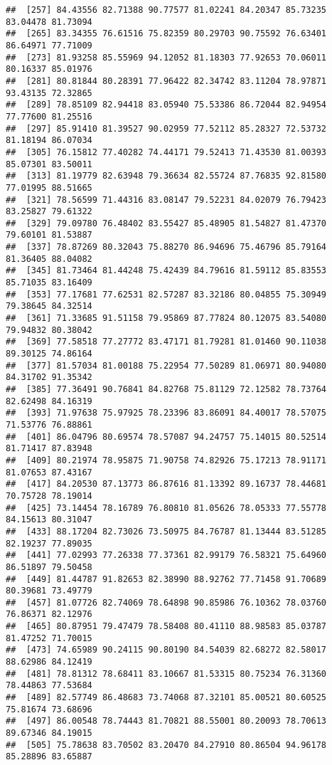 \documentclass[
]{article}
\begin{document}
\begin{verbatim}
##  [257] 84.43556 82.71388 90.77577 81.02241 84.20347 85.73235 83.04478 81.73094
##  [265] 83.34355 76.61516 75.82359 80.29703 90.75592 76.63401 86.64971 77.71009
##  [273] 81.93258 85.55969 94.12052 81.18303 77.92653 70.06011 80.16337 85.01976
##  [281] 80.81844 80.28391 77.96422 82.34742 83.11204 78.97871 93.43135 72.32865
##  [289] 78.85109 82.94418 83.05940 75.53386 86.72044 82.94954 77.77600 81.25516
##  [297] 85.91410 81.39527 90.02959 77.52112 85.28327 72.53732 81.18194 86.07034
##  [305] 76.15812 77.40282 74.44171 79.52413 71.43530 81.00393 85.07301 83.50011
##  [313] 81.19779 82.63948 79.36634 82.55724 87.76835 92.81580 77.01995 88.51665
##  [321] 78.56599 71.44316 83.08147 79.52231 84.02079 76.79423 83.25827 79.61322
##  [329] 79.09780 76.48402 83.55427 85.48905 81.54827 81.47370 79.60101 81.53887
##  [337] 78.87269 80.32043 75.88270 86.94696 75.46796 85.79164 81.36405 88.04082
##  [345] 81.73464 81.44248 75.42439 84.79616 81.59112 85.83553 85.71035 83.16409
##  [353] 77.17681 77.62531 82.57287 83.32186 80.04855 75.30949 79.38645 84.32514
##  [361] 71.33685 91.51158 79.95869 87.77824 80.12075 83.54080 79.94832 80.38042
##  [369] 77.58518 77.27772 83.47171 81.79281 81.01460 90.11038 89.30125 74.86164
##  [377] 81.57034 81.00188 75.22954 77.50289 81.06971 80.94080 84.31702 91.35342
##  [385] 77.36491 90.76841 84.82768 75.81129 72.12582 78.73764 82.62498 84.16319
##  [393] 71.97638 75.97925 78.23396 83.86091 84.40017 78.57075 71.53776 76.88861
##  [401] 86.04796 80.69574 78.57087 94.24757 75.14015 80.52514 81.71417 87.83948
##  [409] 80.21974 78.95875 71.90758 74.82926 75.17213 78.91171 81.07653 87.43167
##  [417] 84.20530 87.13773 86.87616 81.13392 89.16737 78.44681 70.75728 78.19014
##  [425] 73.14454 78.16789 76.80810 81.05626 78.05333 77.55778 84.15613 80.31047
##  [433] 88.17204 82.73026 73.50975 84.76787 81.13444 83.51285 82.19237 77.89035
##  [441] 77.02993 77.26338 77.37361 82.99179 76.58321 75.64960 86.51897 79.50458
##  [449] 81.44787 91.82653 82.38990 88.92762 77.71458 91.70689 80.39681 73.49779
##  [457] 81.07726 82.74069 78.64898 90.85986 76.10362 78.03760 76.86371 82.12976
##  [465] 80.87951 79.47479 78.58408 80.41110 88.98583 85.03787 81.47252 71.70015
##  [473] 74.65989 90.24115 90.80190 84.54039 82.68272 82.58017 88.62986 84.12419
##  [481] 78.81312 78.68411 83.10667 81.53315 80.75234 76.31360 78.44863 77.53684
##  [489] 82.57749 86.48683 73.74068 87.32101 85.00521 80.60525 75.81674 73.68696
##  [497] 86.00548 78.74443 81.70821 88.55001 80.20093 78.70613 89.67346 84.19015
##  [505] 75.78638 83.70502 83.20470 84.27910 80.86504 94.96178 85.28896 83.65887

\end{verbatim}
\end{document}

